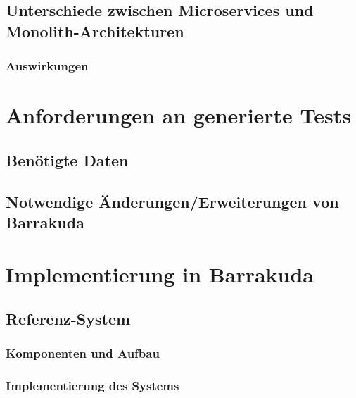 \documentclass[12pt,a4paper,bibliography=totocnumbered,listof=totocnumbered]{scrartcl}
\begin{document}
\subsection{Unterschiede zwischen Microservices und Monolith-Architekturen}

\subsubsection{Auswirkungen}

\section{Anforderungen an generierte Tests}

\subsection{Benötigte Daten}

\subsection{Notwendige Änderungen/Erweiterungen von Barrakuda}

\section{Implementierung in Barrakuda}

\subsection{Referenz-System}

\subsubsection{Komponenten und Aufbau}

\subsubsection{Implementierung des Systems}
\end{document}
